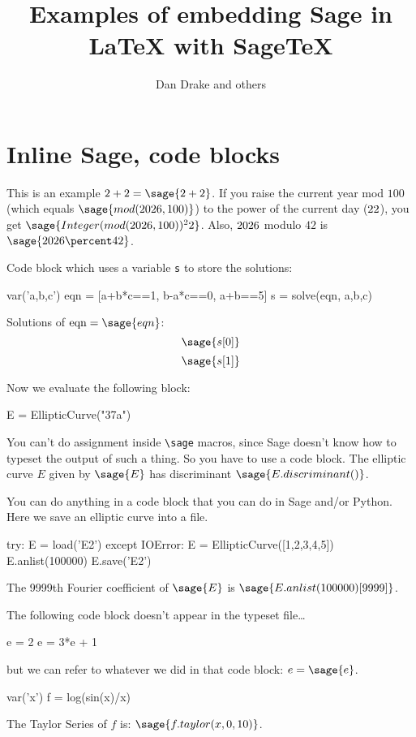 \documentclass{article}
\title{Examples of embedding Sage in \LaTeX{} with \textsf{Sage\TeX}}
\author{Dan Drake and others}
\begin{document}
\maketitle

\section{Inline Sage, code blocks}

This is an example $2+2=\sage{2+2}$. If you raise the current year mod
$100$ (which equals $\sage{mod(\the\year, 100)}$) to the power of the
current day ($\the\day$), you get $\sage{Integer(mod(\the\year,
100))^\the\day}$. Also, $\the\year$ modulo $42$ is $\sage{\the\year
\percent 42}$.

Code block which uses a variable \texttt{s} to store the solutions:
\begin{sageblock}
 var('a,b,c')
 eqn = [a+b*c==1, b-a*c==0, a+b==5]
 s = solve(eqn, a,b,c)
\end{sageblock}

Solutions of $\mbox{eqn}=\sage{eqn}$:
\[
\sage{s[0]}
\]
\[
\sage{s[1]}
\]

Now we evaluate the following block:
\begin{sageblock}
E = EllipticCurve("37a")
\end{sageblock}
You can't do assignment inside \verb|\sage| macros, since Sage doesn't
know how to typeset the output of such a thing. So you have to use a
code block. The elliptic curve $E$ given by $\sage{E}$ has discriminant
$\sage{E.discriminant()}$. 

You can do anything in a code block that you can do in Sage and/or
Python. Here we save an elliptic curve into a file.
\begin{sageblock}
try:
    E = load('E2')
except IOError:
    E = EllipticCurve([1,2,3,4,5])
    E.anlist(100000)
    E.save('E2')
\end{sageblock}

The 9999th Fourier coefficient of $\sage{E}$ is 
$\sage{E.anlist(100000)[9999]}$. 

The following code block doesn't appear in the typeset file\dots
\begin{sagesilent}
  e = 2
  e = 3*e + 1
\end{sagesilent}
but we can refer to whatever we did in that code block: $e=\sage{e}$.

\begin{sageblock}
  var('x')
  f = log(sin(x)/x)
\end{sageblock}
The Taylor Series of $f$ is: $\sage{ f.taylor(x, 0, 10) }$.
\end{document}
